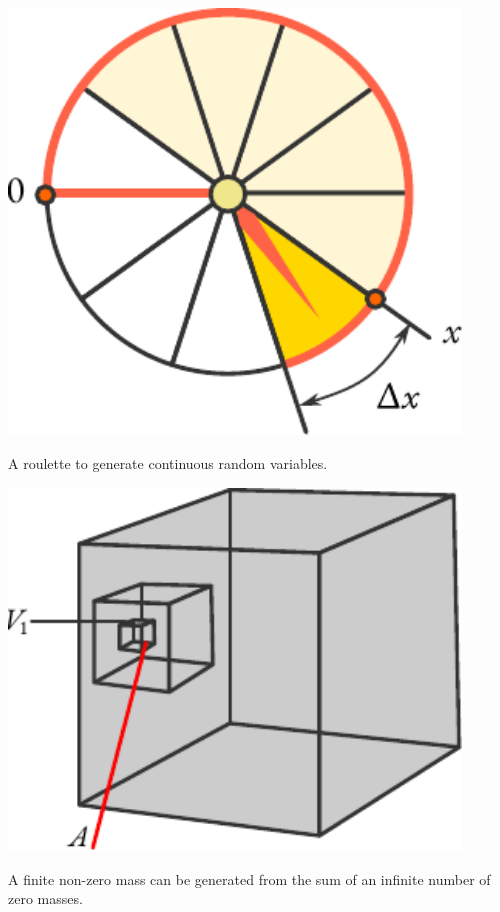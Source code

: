 \begin{marginfigure}[-4cm]%
 \centering
 \includegraphics[width=0.9\textwidth]{figures/roulette.pdf}
\caption{A roulette to generate continuous random variables.\label{roulette}}
 \end{marginfigure}

\begin{marginfigure}[2cm]%
 \centering
 \includegraphics[width=0.9\textwidth]{figures/cubes.pdf}
\caption{A finite non-zero mass can be generated from the sum of an infinite number of zero masses.\label{cubes}}
 \end{marginfigure}


